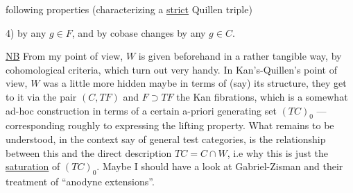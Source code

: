 
following properties (characterizing a \uline{strict} Quillen triple)

4)   by any $g\in F$, and by cobase changes by any $g\in C$.


\uline{NB} From my point of view, $W$ is given beforehand in a rather tangible way, by cohomological criteria, which turn out very handy. In Kan's-Quillen's point of view, $W$ was a little more hidden maybe in terms of (say) its structure, they get to it via  the pair $(C,TF)$ and $F\supset TF$ the Kan fibrations, which is a somewhat ad-hoc construction in terms of a certain  a-priori generating set $(TC)_0$ --- corresponding roughly to expressing the  lifting property. What remains to be understood, in the context say of general test categories, is the relationship between this and the direct description $TC=C\cap W$,  i.e why this is just the \uline{saturation} of $(TC)_0$. Maybe I should have a look at Gabriel-Zisman and their treatment of ``anodyne extensions''.


